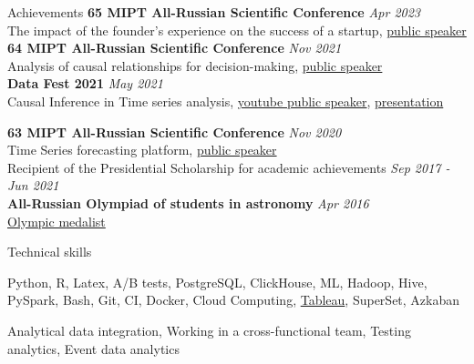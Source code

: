 \documentclass{resume} %
\begin{document}
\begin{rSection}{ Achievements }
    { \bf 65 MIPT All-Russian Scientific Conference} \hfill {\em Apr 2023}\\
    { The impact of the founder's experience on the success of a startup, \href{https://cloud.mail.ru/public/MX9H/iHwYh83YF}{public speaker}}\\

    { \bf 64 MIPT All-Russian Scientific Conference} \hfill {\em Nov 2021}\\
    { Analysis of causal relationships for decision-making, \href{https://cloud.mail.ru/public/eX5G/TXK6Dec1n}{public speaker}}\\

    { \bf Data Fest 2021} \hfill {\em May 2021}\\
    { Causal Inference in Time series analysis, \href{https://youtu.be/Yr6b8Rpy7Ds?si=eRVetPjhOVPavYjh}{youtube public speaker}}, \href{https://cloud.mail.ru/public/32Dj/LT7jcjvEN}{presentation}

    { \bf 63 MIPT All-Russian Scientific Conference} \hfill {\em Nov 2020}\\
    { Time Series forecasting platform, \href{https://cloud.mail.ru/public/RfQG/zxTL83oEh}{public speaker}}\\

    { Recipient of the Presidential Scholarship for academic achievements} \hfill {\em Sep 2017 - Jun 2021}\\

    { \bf All-Russian Olympiad of students in astronomy} \hfill {\em Apr 2016}\\
    \href{https://cloud.mail.ru/public/hwTV/8Z2drbXEg}{Olympic medalist}
\end{rSection}
    
\begin{rSection}{ Technical skills }
    
    Python, R, Latex, A/B tests, PostgreSQL, ClickHouse, ML, Hadoop, Hive, PySpark, Bash, Git, CI, Docker, Cloud Computing,  \href{https://public.tableau.com/profile/dmitriy5983#!/}{Tableau}, SuperSet, Azkaban
    
    Analytical data integration, Working in a cross-functional team, Testing analytics, Event data analytics 

\end{rSection}
\end{document}
